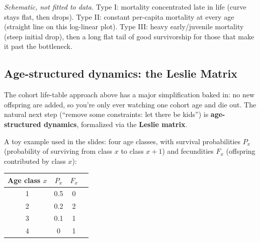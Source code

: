 \documentclass[11pt,a4paper]{article}
\begin{document}
\begin{figbox}[title={The three idealized survivorship curve types}]
\centering
{}

\vspace{2mm}
\footnotesize\emph{Schematic, not fitted to data.} Type I: mortality concentrated late in life (curve stays flat, then drops). Type II: constant per-capita mortality at every age (straight line on this log-linear plot). Type III: heavy early/juvenile mortality (steep initial drop), then a long flat tail of good survivorship for those that make it past the bottleneck.
\end{figbox}

\subsection{Age-structured dynamics: the Leslie Matrix}
The cohort life-table approach above has a major simplification baked in: no new offspring are added, so you're only ever watching one cohort age and die out. The natural next step (``remove some constraints: let there be kids'') is \textbf{age-structured dynamics}, formalized via the \textbf{Leslie matrix}.

A toy example used in the slides: four age classes, with survival probabilities $P_x$ (probability of surviving from class $x$ to class $x+1$) and fecundities $F_x$ (offspring contributed by class $x$):

\begin{center}
\begin{tabular}{@{}cccc@{}}
\toprule
Age class $x$ & $P_x$ & $F_x$ \\
\midrule
1 & 0.5 & 0 \\
2 & 0.2 & 2 \\
3 & 0.1 & 1 \\
4 & 0 & 1 \\
\bottomrule
\end{tabular}
\end{center}
\end{document}

